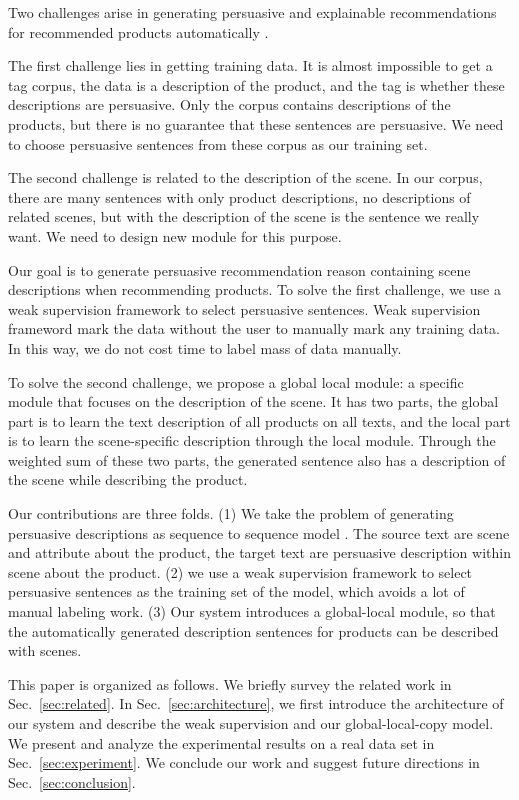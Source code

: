 \documentclass[sigconf]{acmart}
\begin{document}
Two challenges arise in generating persuasive and explainable recommendations for recommended products automatically .

The first challenge lies in getting training data. It is almost impossible to get a tag corpus, the data is a description of the product, and the tag is whether these descriptions are persuasive. Only the corpus contains descriptions of the products, but there is no guarantee that these sentences are persuasive. We need to choose persuasive sentences from these corpus as our training set.

The second challenge is related to the description of the scene. In our corpus, there are many sentences with only product descriptions, no descriptions of related scenes, but with the description of the scene is the sentence we really want. We need to design new module for this purpose.

Our goal is to generate persuasive recommendation reason containing scene descriptions when recommending products. To solve the first challenge, we use a weak supervision framework to select persuasive sentences. Weak supervision frameword mark the data without the user to manually mark any training data. In this way, we do not cost time to label mass of data manually.

To solve the second challenge, we propose a global local module: a specific module that focuses on the description of the scene. It has two parts, the global part is to learn the text description of all products on all texts, and the local part is to learn the scene-specific description through the local module. Through the weighted sum of these two parts, the generated sentence also has a description of the scene while describing the product.

Our contributions are three folds. (1) We take the problem of generating persuasive descriptions as sequence to sequence model . The source text are scene and attribute about the product, the target text are persuasive description within scene about the product. (2) we use a weak supervision framework to select persuasive sentences as the training set of the model, which avoids a lot of manual labeling work. (3) Our system introduces a global-local module, so that the automatically generated description sentences for products can be described with scenes. 

This paper is organized as follows. We briefly survey the related work in Sec.~\ref{sec:related}. In Sec.~\ref{sec:architecture}, we first introduce the architecture of our system and describe the weak supervision and our global-local-copy model. We present and analyze the experimental results on a real data set in Sec.~\ref{sec:experiment}. We conclude our work and suggest future directions in Sec.~\ref{sec:conclusion}.
\end{document}
